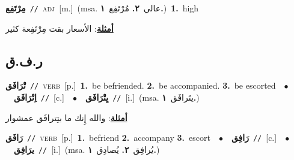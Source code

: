\documentclass[10pt,a4paper,twoside]{article} %
\begin{document}
\begin{multicols}{2}
{\setlength\topsep{0pt}\textbf{\foreignlanguage{arabic}{مِرْتَفِع}}\ {\color{gray}\texttt{//}\color{black}}\ \textsc{adj}\ [m.]\ \color{gray}(msa. \foreignlanguage{arabic}{عالي}~\foreignlanguage{arabic}{\textbf{٢.}}  \foreignlanguage{arabic}{مُرْتَفِع}~\foreignlanguage{arabic}{\textbf{١.}})\color{black}\ \textbf{1.}~high\  \begin{flushright}\color{gray}\foreignlanguage{arabic}{\textbf{\underline{\foreignlanguage{arabic}{أمثلة}}}: الأسعار بقت مِرْتَفِعة كثير}\end{flushright}\color{black}} \vspace{2mm}

\vspace{-3mm}
\subsection*{\color{blue}\foreignlanguage{arabic}{ر.ف.ق}\color{blue}{}} 

{\setlength\topsep{0pt}\textbf{\foreignlanguage{arabic}{تْرَافَق}}\ {\color{gray}\texttt{//}\color{black}}\ \textsc{verb}\ [p.]\ \textbf{1.}~be befriended.  \textbf{2.}~be accompanied.  \textbf{3.}~be escorted\ \ $\bullet$\ \ \setlength\topsep{0pt}\textbf{\foreignlanguage{arabic}{اِتْرَافَق}}\ {\color{gray}\texttt{//}\color{black}}\ [c.]\ \ $\bullet$\ \ \setlength\topsep{0pt}\textbf{\foreignlanguage{arabic}{يِتْرَافَق}}\ {\color{gray}\texttt{//}\color{black}}\ [i.]\ \color{gray}(msa. \foreignlanguage{arabic}{يتَرافَق}~\foreignlanguage{arabic}{\textbf{١.}})\color{black}\  \begin{flushright}\color{gray}\foreignlanguage{arabic}{\textbf{\underline{\foreignlanguage{arabic}{أمثلة}}}: والله إِنك ما بتِترافَق عمشوار}\end{flushright}\color{black}} \vspace{2mm}

{\setlength\topsep{0pt}\textbf{\foreignlanguage{arabic}{رَافَق}}\ {\color{gray}\texttt{//}\color{black}}\ \textsc{verb}\ [p.]\ \textbf{1.}~befriend  \textbf{2.}~accompany  \textbf{3.}~escort\ \ $\bullet$\ \ \setlength\topsep{0pt}\textbf{\foreignlanguage{arabic}{رَافِق}}\ {\color{gray}\texttt{//}\color{black}}\ [c.]\ \ $\bullet$\ \ \setlength\topsep{0pt}\textbf{\foreignlanguage{arabic}{يرَافِق}}\ {\color{gray}\texttt{//}\color{black}}\ [i.]\ \color{gray}(msa. \foreignlanguage{arabic}{يُرافِق}~\foreignlanguage{arabic}{\textbf{٢.}}  \foreignlanguage{arabic}{يُصادِق}~\foreignlanguage{arabic}{\textbf{١.}})\color{black}\ } \vspace{2mm}


\end{multicols}
\end{document}
